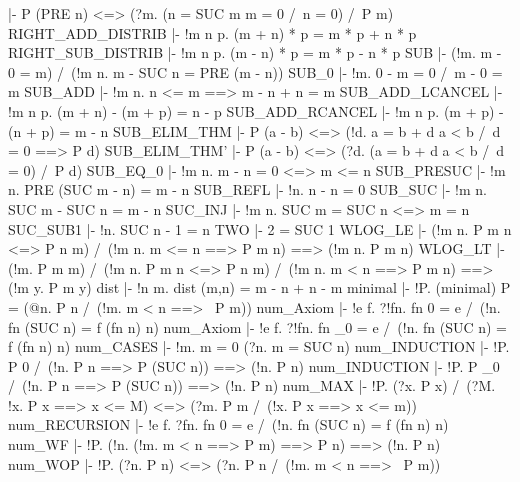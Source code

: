   |- P (PRE n) <=> (?m. (n = SUC m \/ m = 0 /\ n = 0) /\ P m)
\ENDTHEOREM
\THEOREM RIGHT\_ADD\_DISTRIB
  |- !m n p. (m + n) * p = m * p + n * p
\ENDTHEOREM
\THEOREM RIGHT\_SUB\_DISTRIB
  |- !m n p. (m - n) * p = m * p - n * p
\ENDTHEOREM
\THEOREM SUB
  |- (!m. m - 0 = m) /\ (!m n. m - SUC n = PRE (m - n))
\ENDTHEOREM
\THEOREM SUB\_0
  |- !m. 0 - m = 0 /\ m - 0 = m
\ENDTHEOREM
\THEOREM SUB\_ADD
  |- !m n. n <= m ==> m - n + n = m
\ENDTHEOREM
\THEOREM SUB\_ADD\_LCANCEL
  |- !m n p. (m + n) - (m + p) = n - p
\ENDTHEOREM
\THEOREM SUB\_ADD\_RCANCEL
  |- !m n p. (m + p) - (n + p) = m - n
\ENDTHEOREM
\THEOREM SUB\_ELIM\_THM
  |- P (a - b) <=> (!d. a = b + d \/ a < b /\ d = 0 ==> P d)
\ENDTHEOREM
\THEOREM SUB\_ELIM\_THM'
  |- P (a - b) <=> (?d. (a = b + d \/ a < b /\ d = 0) /\ P d)
\ENDTHEOREM
\THEOREM SUB\_EQ\_0
  |- !m n. m - n = 0 <=> m <= n
\ENDTHEOREM
\THEOREM SUB\_PRESUC
  |- !m n. PRE (SUC m - n) = m - n
\ENDTHEOREM
\THEOREM SUB\_REFL
  |- !n. n - n = 0
\ENDTHEOREM
\THEOREM SUB\_SUC
  |- !m n. SUC m - SUC n = m - n
\ENDTHEOREM
\THEOREM SUC\_INJ
  |- !m n. SUC m = SUC n <=> m = n
\ENDTHEOREM
\THEOREM SUC\_SUB1
  |- !n. SUC n - 1 = n
\ENDTHEOREM
\THEOREM TWO
  |- 2 = SUC 1
\ENDTHEOREM
\THEOREM WLOG\_LE
  |- (!m n. P m n <=> P n m) /\ (!m n. m <= n ==> P m n) ==> (!m n. P m n)
\ENDTHEOREM
\THEOREM WLOG\_LT
  |- (!m. P m m) /\ (!m n. P m n <=> P n m) /\ (!m n. m < n ==> P m n)
     ==> (!m y. P m y)
\ENDTHEOREM
\THEOREM dist
  |- !n m. dist (m,n) = m - n + n - m
\ENDTHEOREM
\THEOREM minimal
  |- !P. (minimal) P = (@n. P n /\ (!m. m < n ==> ~P m))
\ENDTHEOREM
\THEOREM num\_Axiom
  |- !e f. ?!fn. fn 0 = e /\ (!n. fn (SUC n) = f (fn n) n)
\ENDTHEOREM
\THEOREM num\_Axiom
  |- !e f. ?!fn. fn _0 = e /\ (!n. fn (SUC n) = f (fn n) n)
\ENDTHEOREM
\THEOREM num\_CASES
  |- !m. m = 0 \/ (?n. m = SUC n)
\ENDTHEOREM
\THEOREM num\_INDUCTION
  |- !P. P 0 /\ (!n. P n ==> P (SUC n)) ==> (!n. P n)
\ENDTHEOREM
\THEOREM num\_INDUCTION
  |- !P. P _0 /\ (!n. P n ==> P (SUC n)) ==> (!n. P n)
\ENDTHEOREM
\THEOREM num\_MAX
  |- !P. (?x. P x) /\ (?M. !x. P x ==> x <= M) <=>
         (?m. P m /\ (!x. P x ==> x <= m))
\ENDTHEOREM
\THEOREM num\_RECURSION
  |- !e f. ?fn. fn 0 = e /\ (!n. fn (SUC n) = f (fn n) n)
\ENDTHEOREM
\THEOREM num\_WF
  |- !P. (!n. (!m. m < n ==> P m) ==> P n) ==> (!n. P n)
\ENDTHEOREM
\THEOREM num\_WOP
  |- !P. (?n. P n) <=> (?n. P n /\ (!m. m < n ==> ~P m))
\ENDTHEOREM

